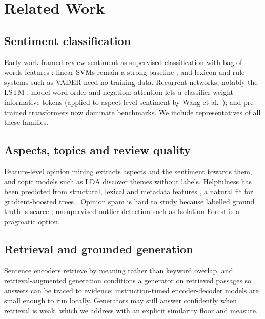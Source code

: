 \documentclass[conference]{IEEEtran}
\begin{document}
\section{Related Work}
\subsection{Sentiment classification}
Early work framed review sentiment as supervised classification with bag-of-words features \cite{pang2002thumbs}; linear SVMs remain a strong baseline \cite{joachims1998text}, and lexicon-and-rule systems such as VADER \cite{hutto2014vader} need no training data. Recurrent networks, notably the LSTM \cite{hochreiter1997lstm}, model word order and negation; attention \cite{bahdanau2015attention} lets a classifier weight informative tokens (applied to aspect-level sentiment by Wang et al.\ \cite{wang2016attention}); and pre-trained transformers \cite{devlin2019bert,sanh2019distilbert} now dominate benchmarks. We include representatives of all these families.

\subsection{Aspects, topics and review quality}
Feature-level opinion mining \cite{hu2004mining} extracts aspects and the sentiment towards them, and topic models such as LDA \cite{blei2003lda} discover themes without labels. Helpfulness has been predicted from structural, lexical and metadata features \cite{kim2006automatically}, a natural fit for gradient-boosted trees \cite{chen2016xgboost}. Opinion spam is hard to study because labelled ground truth is scarce \cite{jindal2008opinion,ott2011finding}; unsupervised outlier detection such as Isolation Forest \cite{liu2008isolation} is a pragmatic option.

\subsection{Retrieval and grounded generation}
Sentence encoders \cite{reimers2019sbert,wang2020minilm} retrieve by meaning rather than keyword overlap, and retrieval-augmented generation \cite{lewis2020rag} conditions a generator on retrieved passages so answers can be traced to evidence; instruction-tuned encoder-decoder models \cite{raffel2020t5,chung2022flan} are small enough to run locally. Generators may still answer confidently when retrieval is weak, which we address with an explicit similarity floor and measure.
\end{document}
